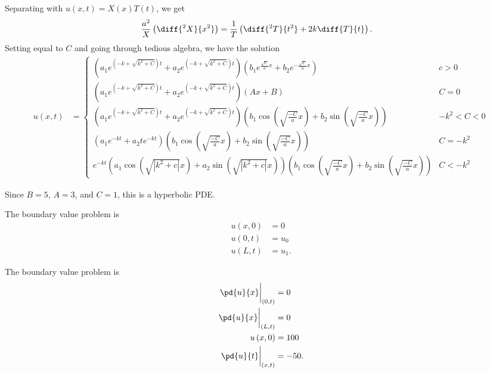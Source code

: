 \documentclass[10pt]{mypackage}
\begin{document}
\begin{solution}[12.1, Problem 12]
  Separating with $u\left( x,t \right) = X(x)T(t)$, we get
  \begin{align*}
    \frac{a^2}{X}\left( \diff{^2X}{x^2} \right) &= \frac{1}{T}\left( \diff{^2T}{t^2} + 2k\diff{T}{t} \right).
  \end{align*}
  Setting equal to $C$ and going through tedious algebra, we have the solution
  \begin{align*}
    u\left( x,t \right) &= \begin{cases}
      \left( a_1e^{\left( -k+\sqrt{k^2 + C} \right)t} + a_2e^{\left( -k+ \sqrt{k^2 + C} \right)t} \right)\left( b_1e^{\frac{\sqrt{C}}{a}x} + b_2e^{-\frac{\sqrt{C}}{a}x} \right) & c > 0\\
      \left( a_1e^{\left( -k+\sqrt{k^2 + C} \right)t} + a_2e^{\left( -k+ \sqrt{k^2 + C} \right)t} \right)\left( Ax + B \right) & C = 0\\
      \left( a_1e^{\left( -k+\sqrt{k^2 + C} \right)t} + a_2e^{\left( -k+ \sqrt{k^2 + C} \right)t} \right)\left( b_1\cos\left( \sqrt{\frac{-C}{a}}x  \right)+ b_2\sin\left( \sqrt{\frac{-C}{a}}x \right) \right) & -k^2 < C < 0\\
      \left( a_1e^{-kt} + a_2te^{-kt} \right)\left( b_1\cos\left( \sqrt{\frac{-C}{a}}x  \right)+ b_2\sin\left( \sqrt{\frac{-C}{a}}x \right) \right) & C = -k^2\\
      e^{-kt}\left( a_1\cos\left( \sqrt{\left\vert k^2 + c \right\vert}x \right) + a_2\sin\left( \sqrt{\left\vert k^2 + c \right\vert}x \right) \right)\left( b_1\cos\left( \sqrt{\frac{-C}{a}}x  \right)+ b_2\sin\left( \sqrt{\frac{-C}{a}}x \right) \right) & C < -k^2
    \end{cases}
  \end{align*}
\end{solution}
\begin{solution}[12.1, Problem 18]
  Since $B = 5$, $A = 3$, and $C = 1$, this is a hyperbolic PDE.
\end{solution}
\begin{solution}[12.2, Problem 2]
  The boundary value problem is
  \begin{align*}
    u\left( x,0 \right) &= 0\\
    u\left( 0,t \right) &= u_0\\
    u\left( L,t \right) &= u_1.
  \end{align*}
\end{solution}
\begin{solution}[12.2, Problem 4]
  The boundary value problem is
  \begin{align*}
    \pd{u}{x}\biggr\vert_{(0,t)} &= 0\\
    \pd{u}{x}\biggr\vert_{(L,t)} &= 0\\
    u\left( x,0 \right) &= 100\\
    \pd{u}{t}\biggr\vert_{(x,t)} &= -50.
  \end{align*}
\end{solution}
\end{document}
